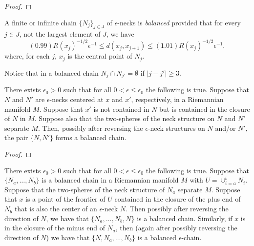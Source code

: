\begin{proof}
\sketch
{}
\end{proof}

A finite or infinite chain $\{N_j\}_{j\in J}$ of $\epsilon$-necks is
{\em balanced} provided that for every $j\in J$, not the largest
element of $J$, we have
\begin{equation}\label{distineq}
(0.99)R(x_j)^{-1/2}\epsilon^{-1}\le d(x_j,x_{j+1})\le
(1.01)R(x_j)^{-1/2}\epsilon^{-1},
\end{equation}
where, for each $j$, $x_j$ is the central point of $N_j$.


Notice that in a balanced chain $N_j\cap N_{j'}=\emptyset$ if
$|j-j'|\ge 3$.










\begin{lemma}
\label{lem:two-necks-form-balanced-chain}
\label{firstchain}

There exists $\epsilon_0>0$ such that for all $0<\epsilon\le
\epsilon_0$ the following is true.  Suppose that $N$ and $N'$ are
$\epsilon$-necks centered at $x$ and $x'$, respectively, in a
Riemannian manifold $M$. Suppose that $x'$ is not contained in $N$
but is contained in the closure of $N$ in $M$. Suppose also that the
two-spheres of the neck structure on $N$ and $N'$ separate $M$.
Then, possibly after reversing the $\epsilon$-neck structures on $N$
and/or $N'$, the pair $\{N,N'\}$ forms a balanced chain.
\end{lemma}

\begin{proof}
\sketch
{}
\end{proof}




\begin{lemma}
\label{lem:extend-balanced-chain}
\label{addaneck}

There exists $\epsilon_0>0$ such that for all $0<\epsilon\le
\epsilon_0$ the following is true.  Suppose that
$\{N_a,\ldots,N_b\}$ is a balanced chain in a Riemannian manifold
$M$ with $U=\cup_{i=a}^bN_i$. Suppose that the two-spheres of the
neck structure of $N_a$ separate $M$.
 Suppose that $x$
is a point of the frontier of $U$ contained in the closure of the
plus end of $N_b$ that is also the center of an $\epsilon$-neck $N$.
Then possibly after reversing the direction of $N$, we have that
$\{N_a,\ldots,N_b,N\}$ is a balanced chain. Similarly, if $x$ is in
the closure of the minus end of $N_a$, then (again after possibly
reversing the direction of $N$) we have that $\{N,N_a,\ldots,N_b\}$
is a balanced $\epsilon$-chain.
\end{lemma}

